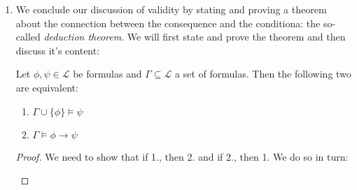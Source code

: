\begin{enumerate}[\thesection.1]
\begin{itemize}
			\begin{proof}
			We will actually not prove this from definitions, but rather using the laws of logic from 5.2.6 and the result $\vDash p\lor\neg p$ from 5.2.11. For note that by de Morgan's law, we have that $\neg (p\land\neg p)\equi \neg p\lor \neg\neg p$. By Double Negation, $\neg\neg p\equi p$ and so $\neg p\lor \neg\neg p\equi \neg p\lor p$. By Commutativity, we have that $\neg p\lor p\equi p\lor \neg p$. So, putting all of this together and using Transitivity a bunch of times, we get that  $\neg (p\land\neg p)\equi p\lor\neg p$. And we know that $\vDash p\lor \neg p$ from 5.2.11. By definition, this means that $\llbracket p\lor\neg p\rrbracket_v=1$ for all valuations $v$. Since $\neg (p\land\neg p)\equi p\lor\neg p$, by Proposition 5.2.5, we have that for every valuation $v$, $\llbracket p\lor\neg p\rrbracket_v=\llbracket \neg(p\land\neg p)\rrbracket_v$. But that just means that $\llbracket \neg(p\land\neg p)\rrbracket_v=1$, for all valuations $v$.
			\end{proof}
		
		\end{itemize} 
	
			\item We conclude our discussion of validity by stating and proving a theorem about the connection between the consequence and the conditiona: the so-called \emph{deduction theorem}. We will first state and prove the theorem and then discuss it's content:
			\begin{theorem}
			Let $\phi,\psi\in\mathcal{L}$ be formulas and $\Gamma\subseteq\mathcal{L}$ a set of formulas. Then the following two are equivalent:
			\begin{enumerate}[1.]
			
				\item $\Gamma\cup\{\phi\}\vDash\psi$
				
				\item $\Gamma\vDash \phi\to\psi$
			
			\end{enumerate}
			\end{theorem}
			\begin{proof}
			We need to show that if 1., then 2. and if 2., then 1. We do so in turn:
			
			\begin{itemize}
			

\end{itemize}
\end{proof}
\end{enumerate}
